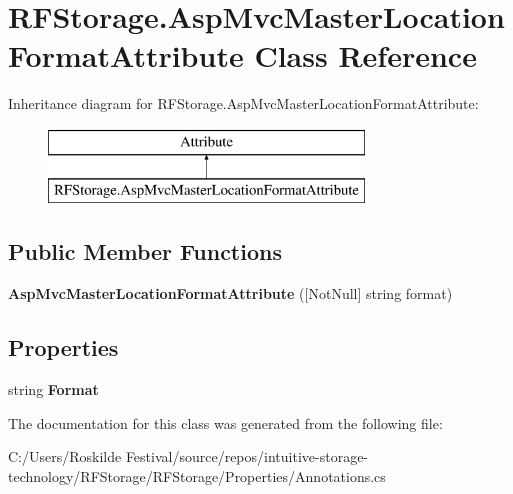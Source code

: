 \section{R\+F\+Storage.\+Asp\+Mvc\+Master\+Location\+Format\+Attribute Class Reference}
\label{class_r_f_storage_1_1_asp_mvc_master_location_format_attribute}
Inheritance diagram for R\+F\+Storage.\+Asp\+Mvc\+Master\+Location\+Format\+Attribute\+:\begin{figure}[H]
\begin{center}
\leavevmode
\includegraphics[height=2.000000cm]{class_r_f_storage_1_1_asp_mvc_master_location_format_attribute}
\end{center}
\end{figure}
\subsection*{Public Member Functions}
\begin{DoxyCompactItemize}
\item 
\mbox{\label{class_r_f_storage_1_1_asp_mvc_master_location_format_attribute_a9ab3ad5297e43aeb40795d6383ffced5}} 
{\bfseries Asp\+Mvc\+Master\+Location\+Format\+Attribute} ([Not\+Null] string format)
\end{DoxyCompactItemize}
\subsection*{Properties}
\begin{DoxyCompactItemize}
\item 
\mbox{\label{class_r_f_storage_1_1_asp_mvc_master_location_format_attribute_af929c2646587043830a67207cf5747a1}} 
string {\bfseries Format}\hspace{0.3cm}{\ttfamily  [get]}
\end{DoxyCompactItemize}


The documentation for this class was generated from the following file\+:\begin{DoxyCompactItemize}
\item 
C\+:/\+Users/\+Roskilde Festival/source/repos/intuitive-\/storage-\/technology/\+R\+F\+Storage/\+R\+F\+Storage/\+Properties/Annotations.\+cs\end{DoxyCompactItemize}
